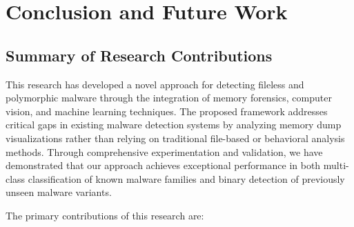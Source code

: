 \chapter{Conclusion and Future Work}

\section{Summary of Research Contributions}

This research has developed a novel approach for detecting fileless and polymorphic malware through the integration of memory forensics, computer vision, and machine learning techniques. The proposed framework addresses critical gaps in existing malware detection systems by analyzing memory dump visualizations rather than relying on traditional file-based or behavioral analysis methods. Through comprehensive experimentation and validation, we have demonstrated that our approach achieves exceptional performance in both multi-class classification of known malware families and binary detection of previously unseen malware variants.

The primary contributions of this research are:

